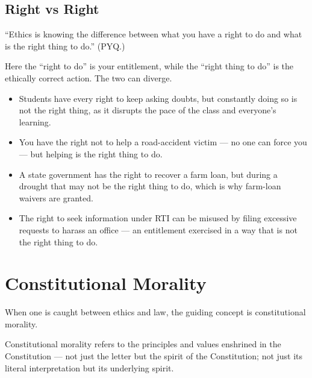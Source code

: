 \subsection{Right vs Right}

\begin{PYQLink}
``Ethics is knowing the difference between what you have a right to do and what is the right thing to do.'' (PYQ.)
\end{PYQLink}

Here the ``right to do'' is your entitlement, while the ``right thing to do'' is the ethically correct action. The two can diverge.

\begin{ExampleBox}
\begin{itemize}
\item Students have every right to keep asking doubts, but constantly doing so is not the right thing, as it disrupts the pace of the class and everyone's learning.
\item You have the right not to help a road-accident victim --- no one can force you --- but helping is the right thing to do.
\item A state government has the right to recover a farm loan, but during a drought that may not be the right thing to do, which is why farm-loan waivers are granted.
\item The right to seek information under RTI can be misused by filing excessive requests to harass an office --- an entitlement exercised in a way that is not the right thing to do.
\end{itemize}
\end{ExampleBox}

\section{Constitutional Morality}

When one is caught between ethics and law, the guiding concept is constitutional morality.

\begin{KeyConcept}
Constitutional morality refers to the principles and values enshrined in the Constitution --- not just the letter but the spirit of the Constitution; not just its literal interpretation but its underlying spirit.
\end{KeyConcept}

